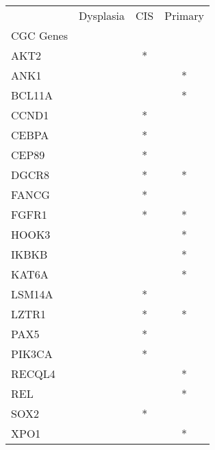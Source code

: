 \begin{tabular}{lccc}
\toprule
{} & Dysplasia & CIS & Primary \\
CGC Genes &           &     &         \\
\midrule
AKT2      &           &   * &         \\
ANK1      &           &     &       * \\
BCL11A    &           &     &       * \\
CCND1     &           &   * &         \\
CEBPA     &           &   * &         \\
CEP89     &           &   * &         \\
DGCR8     &           &   * &       * \\
FANCG     &           &   * &         \\
FGFR1     &           &   * &       * \\
HOOK3     &           &     &       * \\
IKBKB     &           &     &       * \\
KAT6A     &           &     &       * \\
LSM14A    &           &   * &         \\
LZTR1     &           &   * &       * \\
PAX5      &           &   * &         \\
PIK3CA    &           &   * &         \\
RECQL4    &           &     &       * \\
REL       &           &     &       * \\
SOX2      &           &   * &         \\
XPO1      &           &     &       * \\
\bottomrule
\end{tabular}
